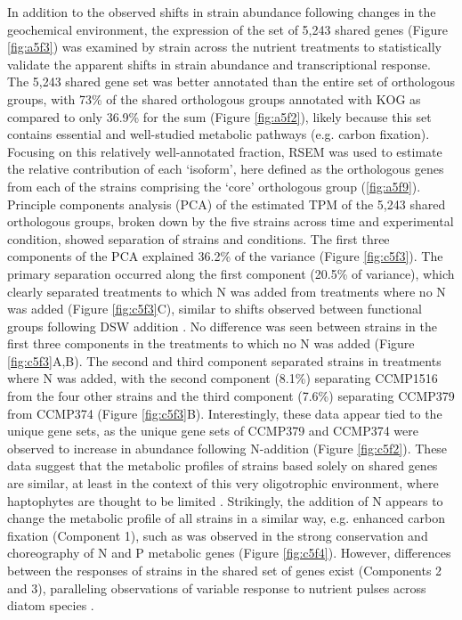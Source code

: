 In addition to the observed shifts in strain abundance following changes in the geochemical environment, the expression of the set of 5,243 shared genes (Figure \ref{fig:a5f3}) was examined by strain across the nutrient treatments to statistically validate the apparent shifts in strain abundance and transcriptional response. The 5,243 shared gene set was better annotated than the entire set of orthologous groups, with 73\% of the shared orthologous groups annotated with KOG as compared to only 36.9\% for the sum (Figure \ref{fig:a5f2}), likely because this set contains essential and well-studied metabolic pathways (e.g. carbon fixation). Focusing on this relatively well-annotated fraction, RSEM \citep{Li2011} was used to estimate the relative contribution of each `isoform', here defined as the orthologous genes from each of the strains comprising the `core' orthologous group (\ref{fig:a5f9}). Principle components analysis (PCA) of the estimated TPM of the 5,243 shared orthologous groups, broken down by the five strains across time and experimental condition, showed separation of strains and conditions. The first three components of the PCA explained 36.2\% of the variance (Figure \ref{fig:c5f3}). The primary separation occurred along the first component (20.5\% of variance), which clearly separated treatments to which N was added from treatments where no N was added (Figure \ref{fig:c5f3}C), similar to shifts observed between functional groups following DSW addition \citep{Alexander2015a}. No difference was seen between strains in the first three components in the treatments to which no N was added (Figure \ref{fig:c5f3}A,B). The second and third component separated strains in treatments where N was added, with the second component (8.1\%) separating CCMP1516 from the four other strains and the third component (7.6\%) separating CCMP379 from CCMP374 (Figure \ref{fig:c5f3}B). Interestingly, these data appear tied to the unique gene sets, as the unique gene sets of CCMP379 and CCMP374 were observed to increase in abundance following N-addition (Figure \ref{fig:c5f2}). These data suggest that the metabolic profiles of strains based solely on shared genes are similar, at least in the context of this very oligotrophic environment, where haptophytes are thought to be limited \citep{Alexander2015a}. Strikingly, the addition of N appears to change the metabolic profile of all strains in a similar way, e.g. enhanced carbon fixation (Component 1), such as was observed in the strong conservation and choreography of N and P metabolic genes (Figure \ref{fig:c5f4}). However, differences between the responses of strains in the shared set of genes exist (Components 2 and 3), paralleling observations of variable response to nutrient pulses across diatom species \citep{Alexander2015}.  \par

